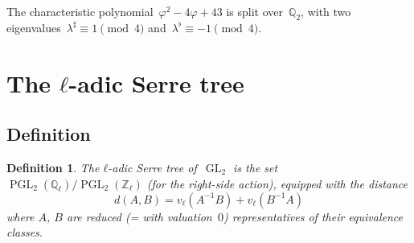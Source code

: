 \documentclass{article}%
\newtheorem{df}{Definition}
\DeclareMathOperator{\PGL}{PGL}
\DeclareMathOperator{\GL}{GL}
\begin{document}
The characteristic polynomial~$φ^2-4φ+43$ is split over~$ℚ_2$, with two
eigenvalues~$λ^{♯} ≡ 1 \pmod{4}$ and~$λ^{♭} ≡ -1 \pmod{4}$.
\section{The $ℓ$-adic Serre tree}%
\subsection{Definition}%
\begin{df}
The \emph{$ℓ$-adic Serre tree} of~$\GL_2$ is the set
$\PGL_2(ℚ_{ℓ})/\PGL_2(ℤ_{ℓ})$ (for the right-side action), equipped with
the distance
\begin{equation}
d(A, B) = v_{ℓ}(A^{-1} B) + v_{ℓ} (B^{-1} A)
\end{equation}
where $A$, $B$ are reduced (= with valuation~$0$) representatives of
their equivalence classes.
\end{df}
\end{document}
